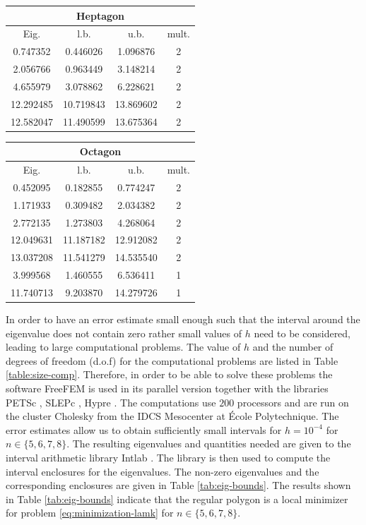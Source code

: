 \begin{table}[htb]
\raisebox{12.5pt}
{\begin{minipage}{.49\textwidth}
\begin{tabular}{|c|c|c|c|}
\hline
\multicolumn{4}{|c|}{Heptagon} \\
\hline
Eig. & l.b. & u.b. & mult. \\ \hline
0.747352 & 0.446026 & 1.096876 & 2\\ \hline
2.056766 & 0.963449 & 3.148214 & 2\\ \hline
4.655979 & 3.078862 & 6.228621 & 2\\ \hline
12.292485 & 10.719843 & 13.869602 &2 \\ \hline
12.582047 & 11.490599 & 13.675364 & 2 \\ \hline
\end{tabular}
\end{minipage}}
\begin{minipage}[t]{.49\textwidth}
\begin{tabular}{|c|c|c|c|}
\hline
\multicolumn{4}{|c|}{Octagon} \\
\hline
Eig. & l.b. & u.b. & mult. \\ \hline
0.452095 & 0.182855 & 0.774247 & 2\\ \hline
1.171933 & 0.309482 & 2.034382 & 2\\ \hline
2.772135 & 1.273803 & 4.268064 & 2\\ \hline
12.049631 & 11.187182 & 12.912082 & 2 \\ \hline
13.037208 & 11.541279 & 14.535540 & 2 \\ \hline
3.999568 & 1.460555 & 6.536411 & 1\\ \hline
11.740713 & 9.203870 & 14.279726 & 1 \\ \hline
\end{tabular}
\end{minipage}
\end{table}

In order to have an error estimate small enough such that the interval around the eigenvalue does not contain zero rather small values of $h$ need to be considered, leading to large computational problems. The value of $h$ and the number of degrees of freedom (d.o.f) for the computational problems are listed in Table \ref{table:size-comp}.
Therefore, in order to be able to solve these problems the software FreeFEM \cite{freefem} is used in its parallel version together with the libraries PETSc \cite{petsc}, SLEPc \cite{slepc}, Hypre \cite{hypre}. The computations use $200$ processors and are run on the cluster Cholesky from the IDCS Mesocenter at École Polytechnique. The error estimates allow us to obtain sufficiently small intervals for $h=10^{-4}$ for $n \in \{5,6,7,8\}$. The resulting eigenvalues and quantities needed are given to the interval arithmetic library Intlab \cite{intlab}. The library is then used to compute the interval enclosures for the eigenvalues. The non-zero eigenvalues and the corresponding enclosures are given in Table \ref{tab:eig-bounds}. The results shown in Table \ref{tab:eig-bounds} indicate that the regular polygon is a local minimizer for problem \eqref{eq:minimization-lamk} for $n \in \{5,6,7,8\}$.

